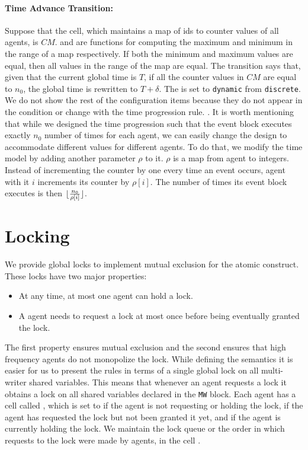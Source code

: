 \paragraph{Time Advance Transition:}
Suppose that the  cell, which maintains a map of ids to counter values of all agents, is $CM$.  and  are functions for computing the maximum and minimum in the range of a map respectively. If both the minimum and maximum values are equal, then all values in the range of the map are equal.  The  transition says that, given that the current global time is $T$, if all the counter values in $CM$ are equal to $n_0$, the global time is rewritten to $T+\delta$. The  is set to \verb|dynamic| from \verb|discrete|. We do not show the rest of the configuration items because they do not appear in the condition or change with the time progression rule. 
. 
It is worth mentioning that while we designed the time progression such that the event block executes exactly $n_0$ number of times for each agent, we can easily change the design to accommodate different values for different agents. To do that, we modify the time model by adding another parameter $\rho$ to it. $\rho$ is a map from agent  to integers. Instead of incrementing the counter by one every time an event occurs, agent with it $i$ increments its counter by $\rho[i]$. The number of times its event block executes is then $\lfloor\frac{n_0}{\rho[i]}\rfloor$.


\section[h]{Locking}
\label{sect:locking}
We provide global locks to implement mutual exclusion for the atomic construct. 
	These locks have two major properties:
    \begin{itemize}
\item At any time, at most one agent can hold a lock. 
\item A agent needs to request a lock at most once before being eventually granted the lock. 
\end{itemize}
The first property ensures mutual exclusion and the second ensures that high frequency agents do not monopolize the lock. 
While defining the semantics it is easier for us to present the rules in terms of a single global lock on all multi-writer shared variables. This means that whenever an agent requests a lock it obtains a lock on all shared variables declared in the \verb|MW| block. Each agent has a cell called , which is set to  if the agent is not requesting or holding the lock,  if the agent has requested the lock but not been granted it yet, and  if the agent is currently holding the lock. We maintain the lock queue or the order in which requests to the lock were made by agents, in the cell . 

